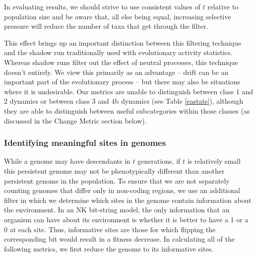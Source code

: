 \documentclass[letterpaper]{article}
\begin{document}
%
In evaluating results, we should strive to use consistent values of $t$ relative to population size and be aware that, all else being equal, increasing selective pressure will reduce the number of taxa that get through the filter.


This effect brings up an important distinction between this filtering technique and the shadow run traditionally used with evolutionary activity statistics. Whereas shadow runs filter out the effect of neutral processes, this technique doesn't entirely. We view this primarily as an advantage -- drift can be an important part of the evolutionary process -- but there may also be situations where it is undesirable. Our metrics are unable to distinguish between class 1 and 2 dynamics or between class 3 and 4b dynamics (see Table \ref{eastats}), although they are able to distinguish between useful subcategories within those classes (as discussed in the Change Metric section below).

\subsubsection{Identifying meaningful sites in genomes}
While a genome may have descendants in $t$ generations, if $t$ is relatively small this persistent genome may not be phenotypically different than another persistent genome in the population. To ensure that we are not separately counting genomes that differ only in non-coding regions, we use an additional filter in which we determine which sites in the genome contain information about the environment. In an NK bit-string model, the only information that an organism can have about its environment is whether it is better to have a 1 or a 0 at each site. Thus, informative sites are those for which flipping the corresponding bit would result in a fitness decrease. In calculating all of the following metrics, we first reduce the genome to its informative sites.
    
\end{document}

